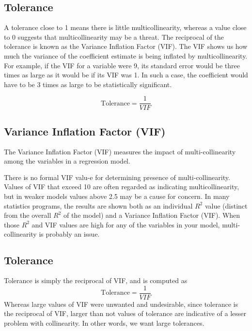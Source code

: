 \documentclass[a4paper,12pt]{article}
\begin{document}

\subsection{Tolerance}
A tolerance close to 1 means there is little multicollinearity, whereas a value close to 0 suggests that multicollinearity may be a threat. The reciprocal of the tolerance is known as the Variance Inflation Factor (VIF). The VIF shows us how much the variance of the coefficient estimate is being inflated by multicollinearity. For example, if the VIF for a variable were 9, its standard error would be three times as large as it would be if its VIF was 1. In such a case, the coefficient would have to be 3 times as large to be statistically significant.

\[ \mbox{Tolerance} = \frac{1}{VIF}\]

\subsection{Variance Inflation Factor (VIF)}



The Variance Inflation Factor (VIF) measures the impact of multi-collinearity among the variables in a regression model. 
     
There is no formal VIF valu-e for determining presence of multi-collinearity. Values of VIF that exceed 10 are often regarded as indicating multicollinearity, but in weaker models values above 2.5 may be a cause for concern. In many statistics programs, the results are shown both as an individual $R^2$ value (distinct from the overall $R^2$ of the model) and a Variance Inflation Factor (VIF). When those $R^2$ and VIF values are high for any of the variables in your model, multi-collinearity is probably an issue. 

     

\subsection{Tolerance}

Tolerance is simply the reciprocal of VIF, and is computed as
\[ \mbox{Tolerance} = \frac{1}{VIF}\]
Whereas large values of VIF were unwanted and undesirable, since tolerance is the reciprocal of VIF, larger than not values of tolerance are indicative of a lesser problem with collinearity. In other words, we want large tolerances.
\end{document}
